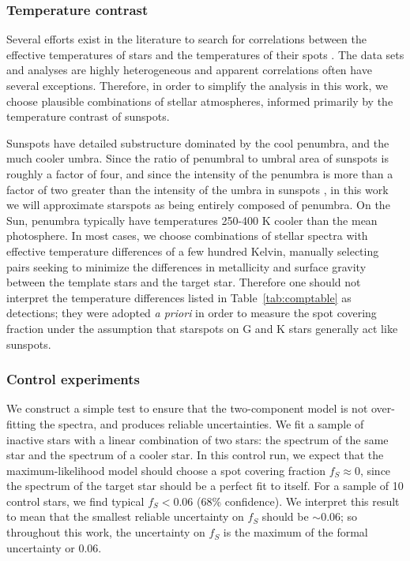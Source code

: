 \subsubsection{Temperature contrast}

Several efforts exist in the literature to search for correlations between the effective temperatures of stars and the temperatures of their spots \citep[e.g.][]{Berdyugina2005, Mancini2014}. The data sets and analyses are highly heterogeneous and apparent correlations often have several exceptions. Therefore, in order to simplify the analysis in this work, we choose plausible combinations of stellar atmospheres, informed primarily by the temperature contrast of sunspots. 

Sunspots have detailed substructure dominated by the cool penumbra, and the much cooler umbra. Since the ratio of penumbral to umbral area of sunspots is roughly a factor of four, and since the intensity of the penumbra is more than a factor of two greater than the intensity of the umbra in sunspots \citep{Solanki2003}, in this work we will approximate starspots as being entirely composed of penumbra. On the Sun, penumbra typically have temperatures 250-400 K cooler than the mean photosphere. In most cases, we choose combinations of stellar spectra with effective temperature differences of a few hundred Kelvin, manually selecting pairs seeking to minimize the differences in metallicity and surface gravity between the template stars and the target star. Therefore one should not interpret the temperature differences listed in Table~\ref{tab:comptable} as detections; they were adopted \textit{a priori} in order to measure the spot covering fraction under the assumption that starspots on G and K stars generally act like sunspots.

\subsubsection{Control experiments}



We construct a simple test to ensure that the two-component model is not over-fitting the spectra, and produces reliable uncertainties. We fit a sample of inactive stars with a linear combination of two stars: the spectrum of the same star and the spectrum of a cooler star. In this control run, we expect that the maximum-likelihood model should choose a spot covering fraction $f_S \approx 0$, since the spectrum of the target star should be a perfect fit to itself. For a sample of 10 control stars, we find typical $f_S < 0.06$ (68\% confidence). We interpret this result to mean that the smallest reliable uncertainty on $f_S$ should be $\sim 0.06$; so throughout this work, the uncertainty on $f_S$ is the maximum of the formal uncertainty or 0.06.


